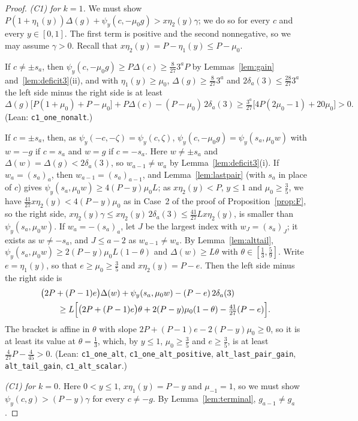 \documentclass[11pt]{article}
\theoremstyle{remark}
\begin{document}
\begin{proof}
\emph{(C1) for $k=1$.} We must show
$P(1+\eta_1(y))\Delta(g)+\psi_y(c,-\mu_0g)>x\eta_2(y)\gamma$; we do so for every
$c$ and every $y\in[0,1]$. The first term is positive and the second nonnegative,
so we may assume $\gamma>0$. Recall that $x\eta_2(y)=P-\eta_1(y)\le P-\mu_0$.

If $c\ne\pm s_a$, then $\psi_y(c,-\mu_0g)\ge P\Delta(c)\ge\frac8{27}3^aP$ by
Lemmas~\ref{lem:gain} and~\ref{lem:deficit3}(ii), and with $\eta_1(y)\ge\mu_0$,
$\Delta(g)\ge\frac8{27}3^a$ and $2\delta_a(3)\le\frac{28}{27}3^a$ the left side
minus the right side is at least
\[
\Delta(g)\bigl[P(1+\mu_0)+P-\mu_0\bigr]+P\Delta(c)-(P-\mu_0)\,2\delta_a(3)
\ge\tfrac{3^a}{27}\bigl[4P(2\mu_0-1)+20\mu_0\bigr]>0.
\]
(Lean: \texttt{c1\_one\_nonalt}.)

If $c=\pm s_a$, then, as $\psi_y(-c,-\zeta)=\psi_y(c,\zeta)$,
$\psi_y(c,-\mu_0g)=\psi_y(s_a,\mu_0w)$ with $w=-g$ if $c=s_a$ and $w=g$ if
$c=-s_a$. Here $w\ne\pm s_a$ and $\Delta(w)=\Delta(g)<2\delta_a(3)$, so
$w_{a-1}\ne w_a$ by Lemma~\ref{lem:deficit3}(i). If $w_a=(s_a)_a$, then
$w_{a-1}=(s_a)_{a-1}$, and Lemma~\ref{lem:lastpair} (with $s_a$ in place of $c$)
gives $\psi_y(s_a,\mu_0w)\ge4(P-y)\mu_0L$; as $x\eta_2(y)<P$, $y\le1$ and
$\mu_0\ge\frac35$, we have $\frac{41}{27}x\eta_2(y)<4(P-y)\mu_0$ as in Case~2 of the
proof of Proposition~\ref{prop:F}, so the right side,
$x\eta_2(y)\gamma\le x\eta_2(y)\,2\delta_a(3)\le\frac{41}{27}Lx\eta_2(y)$, is smaller
than $\psi_y(s_a,\mu_0w)$. If $w_a=-(s_a)_a$, let $J$ be the largest index with
$w_J=(s_a)_J$; it exists as $w\ne-s_a$, and $J\le a-2$ as $w_{a-1}\ne w_a$. By
Lemma~\ref{lem:alttail}, $\psi_y(s_a,\mu_0w)\ge2(P-y)\mu_0L(1-\theta)$ and
$\Delta(w)\ge L\theta$ with $\theta\in[\frac13,\frac59]$. Write $e=\eta_1(y)$, so
that $e\ge\mu_0\ge\frac35$ and $x\eta_2(y)=P-e$. Then the left side minus the right
side is
\begin{align*}
&\bigl(2P+(P-1)e\bigr)\Delta(w)+\psi_y(s_a,\mu_0w)-(P-e)\,2\delta_a(3)\\
&\qquad\ge L\Bigl[\bigl(2P+(P-1)e\bigr)\theta+2(P-y)\mu_0(1-\theta)
-\tfrac{41}{27}(P-e)\Bigr].
\end{align*}
The bracket is affine in $\theta$ with slope
$2P+(P-1)e-2(P-y)\mu_0\ge0$, so it is at least its value at $\theta=\frac13$,
which, by $y\le1$, $\mu_0\ge\frac35$ and $e\ge\frac35$, is at least
$\frac4{27}P-\frac4{45}>0$. (Lean: \texttt{c1\_one\_alt},
\texttt{c1\_one\_alt\_positive}, \texttt{alt\_last\_pair\_gain},
\texttt{alt\_tail\_gain}, \texttt{c1\_alt\_scalar}.)

\emph{(C1) for $k=0$.} Here $0<y\le1$, $x\eta_1(y)=P-y$ and $\mu_{-1}=1$, so we
must show $\psi_y(c,g)>(P-y)\gamma$ for every $c\ne-g$. By
Lemma~\ref{lem:terminal}, $g_{a-1}\ne g_a$.


\end{proof}
\end{document}
